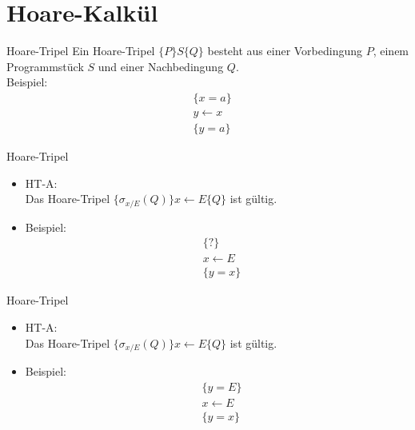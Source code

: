 \section{Hoare-Kalkül}

\begin{frame}{Hoare-Tripel}
  Ein Hoare-Tripel $\{P\}S\{Q\}$ besteht aus einer Vorbedingung $P$, einem Programmstück $S$ und einer Nachbedingung $Q$.\\
  Beispiel: 
  \begin{align*}
    &\{x=a\}\\
    &y\leftarrow x\\
    &\{y=a\}
  \end{align*}
\end{frame}

\begin{frame}{Hoare-Tripel}
  \begin{itemize}
    \item HT-A:\\
      Das Hoare-Tripel $\{\sigma_{x/E}(Q)\}x\leftarrow E\{Q\}$ ist gültig.
    \item Beispiel:\\
      \begin{align*}
        &\{?\}\\
        &x\leftarrow E\\
        &\{y=x\}
      \end{align*}
  \end{itemize}
\end{frame}

\begin{frame}{Hoare-Tripel}
  \begin{itemize}
    \item HT-A:\\
      Das Hoare-Tripel $\{\sigma_{x/E}(Q)\}x\leftarrow E\{Q\}$ ist gültig.
    \item Beispiel:\\
      \begin{align*}
        &\{y=E\}\\
        &x\leftarrow E\\
        &\{y=x\}
    \end{align*}
  \end{itemize}
\end{frame}

